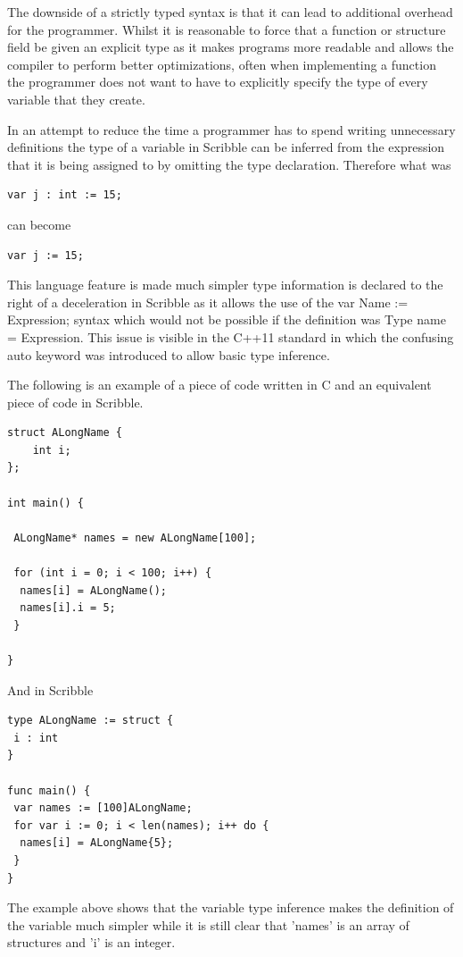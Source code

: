 \documentclass[]{final_report}
\begin{document}
The downside of a strictly typed syntax is that it can lead to additional overhead for the programmer. Whilst it is reasonable to force that a function or structure field be given an explicit type as it makes programs more readable and allows the compiler to perform better optimizations, often when implementing a function the programmer does not want to have to explicitly specify the type of every variable that they create.

In an attempt to reduce the time a programmer has to spend writing unnecessary definitions the type of a variable in Scribble can be inferred from the expression that it is being assigned to by omitting the type declaration. Therefore what was 

\begin{verbatim}
var j : int := 15;
\end{verbatim}
can become \begin{verbatim}
var j := 15;
\end{verbatim}

This language feature is made much simpler type information is declared to the right of a deceleration in Scribble as it allows the use of the var Name := Expression; syntax which would not be possible if the definition was Type name = Expression. This issue is visible in the C++11 standard in which the confusing auto keyword was introduced to allow basic type inference.

The following is an example of a piece of code written in C and an equivalent piece of code in Scribble.

\begin{verbatim}
struct ALongName {
	int i;
};

int main() {

 ALongName* names = new ALongName[100];
 
 for (int i = 0; i < 100; i++) {
  names[i] = ALongName();
  names[i].i = 5;
 }

}
\end{verbatim}
And in Scribble
\begin{verbatim}
type ALongName := struct {
 i : int
}

func main() {
 var names := [100]ALongName;
 for var i := 0; i < len(names); i++ do {
  names[i] = ALongName{5};
 }
}
\end{verbatim}

The example above shows that the variable type inference makes the definition of the variable much simpler while it is still clear that 'names' is an array of structures and 'i' is an integer.
\end{document}
